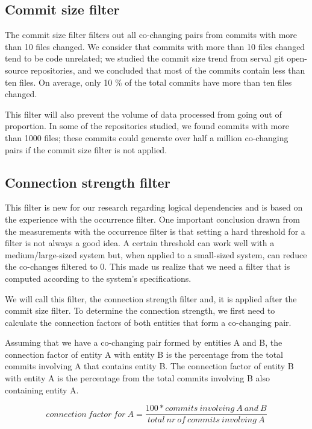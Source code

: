 \documentclass[runningheads]{comsis2}
\begin{document}
\subsection{Commit size filter}

The commit size filter filters out all co-changing pairs from commits with more than 10 files changed. We consider that commits with more than 10 files changed tend to be code unrelated; we studied the commit size trend from serval git open-source repositories, and we concluded that most of the commits contain less than ten files. On average, only 10 \% of the total commits have more than ten files changed. 

This filter will also prevent the volume of data processed from going out of proportion. In some of the repositories studied, we found commits with more than 1000 files; these commits could generate over half a million co-changing pairs if the commit size filter is not applied. 

\subsection{Connection strength filter}

This filter is new for our research regarding logical dependencies and is based on the experience with the occurrence filter.  One important conclusion drawn from the measurements with the occurrence filter is that setting a hard threshold for a filter is not always a good idea. A certain threshold can work well with a medium/large-sized system but, when applied to a small-sized system, can reduce the co-changes filtered to 0. This made us realize that we need a filter that is computed according to the system's specifications. 

We will call this filter, the connection strength filter and, it is applied after the commit size filter. To determine the connection strength, we first need to calculate the connection factors of both entities that form a co-changing pair.

Assuming that we have a co-changing pair formed by entities A and B, the connection factor of entity A with entity B is the percentage from the total commits involving A that contains entity B. The connection factor of entity B with entity A is the percentage from the total commits involving B also containing entity A.

\begin{equation}
 connection\ factor\ for\ A = \frac{100 * commits\ involving\ A\ and\ B}{total\ nr\ of\ commits\ involving\ A}
\end{equation}
\end{document}
